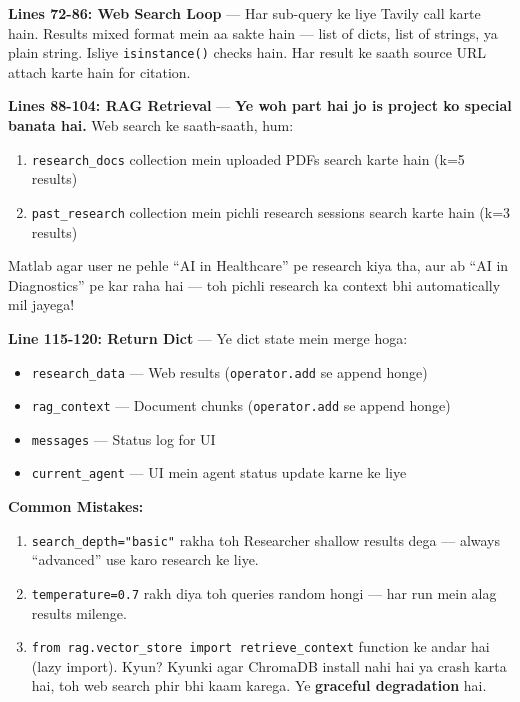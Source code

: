 \documentclass[12pt, a4paper]{article}
\begin{document}
\begin{codestorybox}
\textbf{Lines 72-86: Web Search Loop} --- Har sub-query ke liye Tavily call karte hain. Results mixed format mein aa sakte hain --- list of dicts, list of strings, ya plain string. Isliye \texttt{isinstance()} checks hain. Har result ke saath source URL attach karte hain for citation.

\textbf{Lines 88-104: RAG Retrieval} --- \textbf{Ye woh part hai jo is project ko special banata hai.} Web search ke saath-saath, hum:
\begin{enumerate}
\item \texttt{research\_docs} collection mein uploaded PDFs search karte hain (k=5 results)
\item \texttt{past\_research} collection mein pichli research sessions search karte hain (k=3 results)
\end{enumerate}
Matlab agar user ne pehle ``AI in Healthcare'' pe research kiya tha, aur ab ``AI in Diagnostics'' pe kar raha hai --- toh pichli research ka context bhi automatically mil jayega!

\textbf{Line 115-120: Return Dict} --- Ye dict state mein merge hoga:
\begin{itemize}
\item \texttt{research\_data} --- Web results (\texttt{operator.add} se append honge)
\item \texttt{rag\_context} --- Document chunks (\texttt{operator.add} se append honge)
\item \texttt{messages} --- Status log for UI
\item \texttt{current\_agent} --- UI mein agent status update karne ke liye
\end{itemize}
\end{codestorybox}

\begin{warningbox}
\textbf{Common Mistakes:}
\begin{enumerate}
\item \texttt{search\_depth="basic"} rakha toh Researcher shallow results dega --- always ``advanced'' use karo research ke liye.
\item \texttt{temperature=0.7} rakh diya toh queries random hongi --- har run mein alag results milenge.
\item \texttt{from rag.vector\_store import retrieve\_context} function ke andar hai (lazy import). Kyun? Kyunki agar ChromaDB install nahi hai ya crash karta hai, toh web search phir bhi kaam karega. Ye \textbf{graceful degradation} hai.
\end{enumerate}
\end{warningbox}
\end{document}
